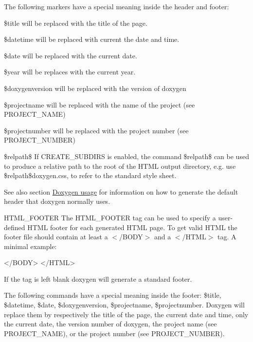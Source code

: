 \begin{DoxyDescription}
The following markers have a special meaning inside the header and footer: 
\begin{DoxyDescription}
\item[{\ttfamily \$title}]will be replaced with the title of the page. 
\item[{\ttfamily \$datetime}]will be replaced with current the date and time. 
\item[{\ttfamily \$date}]will be replaced with the current date. 
\item[{\ttfamily \$year}]will be replaces with the current year. 
\item[{\ttfamily \$doxygenversion}]will be replaced with the version of doxygen 
\item[{\ttfamily \$projectname}]will be replaced with the name of the project (see {\ttfamily PROJECT\_\-NAME}) 
\item[{\ttfamily \$projectnumber}]will be replaced with the project number (see {\ttfamily PROJECT\_\-NUMBER}) 
\item[{\ttfamily \$relpath\$}]If {\ttfamily CREATE\_\-SUBDIRS} is enabled, the command {\ttfamily \$relpath\$} can be used to produce a relative path to the root of the HTML output directory, e.g. use \$relpath\$doxygen.css, to refer to the standard style sheet. 
\end{DoxyDescription}

See also section \hyperlink{doxygen_usage}{Doxygen usage} for information on how to generate the default header that doxygen normally uses.

\label{config_cfg_html_footer}
\hypertarget{config_cfg_html_footer}{}
 
\item[{\ttfamily HTML\_\-FOOTER} ] The {\ttfamily HTML\_\-FOOTER} tag can be used to specify a user-\/defined HTML footer for each generated HTML page. To get valid HTML the footer file should contain at least a {\ttfamily $<$/BODY$>$} and a {\ttfamily $<$/HTML$>$} tag. A minimal example: \begin{DoxyVerb}
    </BODY>
  </HTML>
\end{DoxyVerb}
 If the tag is left blank doxygen will generate a standard footer.

The following commands have a special meaning inside the footer: {\ttfamily \$title}, {\ttfamily \$datetime}, {\ttfamily \$date}, {\ttfamily \$doxygenversion}, {\ttfamily \$projectname}, {\ttfamily \$projectnumber}. Doxygen will replace them by respectively the title of the page, the current date and time, only the current date, the version number of doxygen, the project name (see {\ttfamily PROJECT\_\-NAME}), or the project number (see {\ttfamily PROJECT\_\-NUMBER}).


\end{DoxyDescription}
